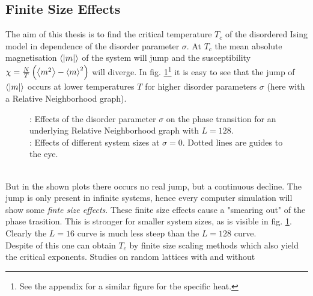 \subsection{Finite Size Effects}
\label{ssec:finitesize}
    The aim of this thesis is to find the critical temperature \(T_c\)
    of the disordered Ising model in dependence of the disorder parameter
    \(\sigma\). At \(T_c\) the mean absolute magnetisation \(\left< |m| \right>\) of
    the system will jump and the susceptibility
    \(\chi = \frac{N}{T}\left(\left< m^2 \right>-\left< m \right>^2\right)\)
    will diverge. In fig. \ref{fig:smeared_out}\footnote{See the appendix for a similar figure for the specific heat.}
    it is easy to see that the jump of \(\left< |m| \right>\)
    occurs at lower temperatures \(T\) for higher
    disorder parameters \(\sigma\) (here with a Relative Neighborhood graph).
    \begin{figure}[htbp]
        \centering
        \caption[Phase Transition and Finite Size Effects]
        {
            : Effects of the disorder
            parameter $\sigma$ on the phase transition
            for an underlying Relative Neighborhood graph with $L=128$.\\
            : Effects of different system
            sizes at \(\sigma = 0\). Dotted lines are guides to the eye.
        }
        \label{fig:smeared_out}
    \end{figure}\\
    But in the shown plots there occurs no real jump, but a continuous
    decline. The jump is only present in infinite systems, hence every
    computer simulation will show some \emph{finte size effects}.
    These finite size effects cause a "smearing out" of the phase
    trasition. This is stronger for smaller system sizes, as is visible
    in fig. \ref{fig:smeared_out}. Clearly
    the \(L=16\) curve is much less steep than the \(L=128\) curve.\\
    Despite of this one can obtain \(T_c\) by finite size scaling
    methods \cite[S. ??]{NewmanBarkema1999} which also yield the critical
    exponents.
    Studies on random lattices with\cite{Lima2000} and without\cite{Janke1994}
